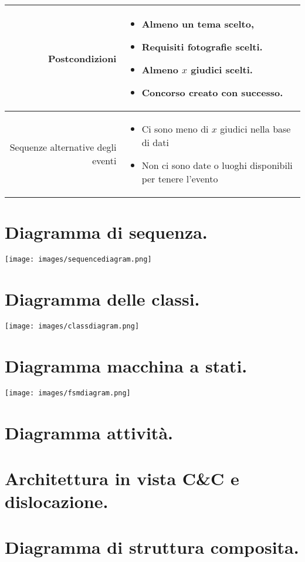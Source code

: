 \documentclass{article}
\begin{document}
\begin{center}
\begin{tabular}{ |r|p{9cm}| }
        \\
        \hline
        Postcondizioni                    &
        \begin{itemize}
            \item Almeno un tema scelto,
            \item Requisiti fotografie scelti.
            \item Almeno $x$ giudici scelti.
            \item Concorso creato con successo.
        \end{itemize}
        \\
        \hline
        Sequenze alternative degli eventi &
        \begin{itemize}
            \item Ci sono meno di $x$ giudici nella base di dati
            \item Non ci sono date o luoghi disponibili per tenere l’evento
        \end{itemize}
        \\
        \hline
    \end{tabular}
\end{center}

\newpage

\section{Diagramma di sequenza.}

\texttt{[image: images/sequencediagram.png]}

\section{Diagramma delle classi.}

\texttt{[image: images/classdiagram.png]}

\section{Diagramma macchina a stati.}

\texttt{[image: images/fsmdiagram.png]}

\section{Diagramma attività.}
\section{Architettura in vista C\&C e dislocazione.}
\section{Diagramma di struttura composita.}
\end{document}
